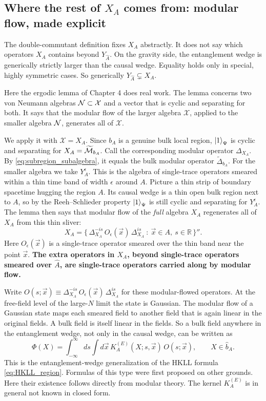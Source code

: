 \subsection*{Where the rest of $X_A$ comes from: modular flow, made explicit}

The double-commutant definition fixes $X_A$ abstractly. It does not say which operators $X_A$ contains
beyond $Y_{\widehat A}$. On the gravity side, the entanglement wedge is generically strictly larger than the
causal wedge. Equality holds only in special, highly symmetric cases. So generically
$Y_{\widehat A}\subsetneq X_A$.

Here the ergodic lemma of Chapter 4 does real work. The lemma concerns two von Neumann algebras
$\mathcal{N}\subset\mathcal X$ and a vector that is cyclic and separating for both. It says that the modular flow of
the larger algebra $\mathcal X$, applied to the smaller algebra $\mathcal{N}$, generates all of $\mathcal X$.

We apply it with $\mathcal X=X_A$. Since $b_A$ is a genuine bulk local region, $\ket1_\Psi$ is cyclic and
separating for $X_A=\widetilde{\mathcal{M}}_{b_A}$. Call the corresponding modular operator $\Delta_{X_A}$. By
\eqref{eq:subregion_subalgebra}, it equals the bulk modular operator $\widetilde\Delta_{b_A}$. For the smaller
algebra we take $Y_A^\epsilon$. This is the algebra of single-trace operators smeared within a thin time band
of width $\epsilon$ around $A$. Picture a thin strip of boundary spacetime hugging the region $A$. Its causal
wedge is a thin open bulk region next to $A$, so by the Reeh--Schlieder property $\ket1_\Psi$ is still cyclic
and separating for $Y_A^\epsilon$. The lemma then says that modular flow of the \emph{full} algebra $X_A$
regenerates all of $X_A$ from this thin sliver:
\[
X_A = \Big\{\, \Delta_{X_A}^{-is}\,O_\epsilon(\vec x)\,\Delta_{X_A}^{is} \ :\ \vec x\in A,\ s\in\mathbb R
\,\Big\}'' .
\]
Here $O_\epsilon(\vec x)$ is a single-trace operator smeared over the thin band near the point $\vec x$.
\textbf{The extra operators in $X_A$, beyond single-trace operators smeared over $\widehat A$, are
single-trace operators carried along by modular flow.}

Write $O(s;\vec x)\equiv\Delta_{X_A}^{-is}\,O_\epsilon(\vec x)\,\Delta_{X_A}^{is}$ for these modular-flowed
operators. At the free-field level of the large-$N$ limit the state is Gaussian. The modular flow of a
Gaussian state maps each smeared field to another field that is again linear in the original fields. A bulk
field is itself linear in the fields. So a bulk field anywhere in the entanglement wedge, not only in the
causal wedge, can be written as
\[
\Phi(X) = \int_{-\infty}^\infty ds\int d\vec x\,K_A^{(E)}(X;s,\vec x)\,O(s;\vec x), \qquad X\in\widehat b_A .
\]
This is the entanglement-wedge generalization of the HKLL formula \eqref{eq:HKLL_region}. Formulas of this
type were first proposed on other grounds. Here their existence follows directly from modular theory. The
kernel $K_A^{(E)}$ is in general not known in closed form.

